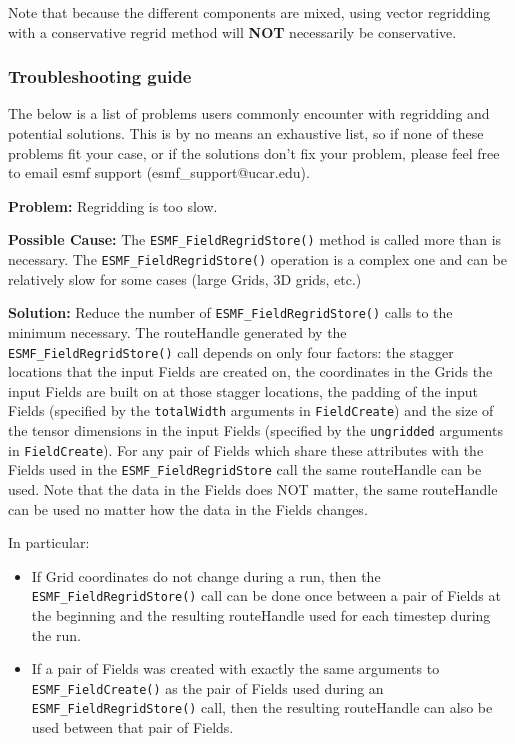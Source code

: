 Note that because the different components are mixed, using vector regridding with a conservative regrid method will {\bf NOT} necessarily be conservative. 


\subsubsection{Troubleshooting guide}

 The below is a list of problems users commonly encounter with regridding and potential solutions. 
 This is by no means an exhaustive list, so if none of these problems fit your case, or if the solutions
 don't fix your problem, please feel free to email esmf support (esmf\_support@ucar.edu).

 \bigskip
 
 {\bf Problem:} Regridding is too slow.

 \medskip

 {\bf Possible Cause:} The {\tt ESMF\_FieldRegridStore()} method is called more than is necessary. \newline
 The {\tt ESMF\_FieldRegridStore()} operation is a complex one and can be 
 relatively slow for some cases (large Grids, 3D grids, etc.) 
 
 \smallskip

 {\bf Solution:} Reduce the number of {\tt ESMF\_FieldRegridStore()} calls to the minimum necessary. The
 routeHandle generated by the {\tt ESMF\_FieldRegridStore()} call depends on only four factors: the 
 stagger locations that the input Fields are created on, the coordinates in the Grids the input Fields
 are built on at those stagger locations, the padding of the input Fields 
 (specified by the {\tt totalWidth} arguments in {\tt FieldCreate}) and the size of the tensor
 dimensions in the input Fields (specified by the {\tt ungridded} arguments in {\tt FieldCreate}). 
 For any pair of Fields which share these attributes with the Fields used in the
 {\tt ESMF\_FieldRegridStore} call  the same routeHandle can be used. Note that the data in the 
 Fields does NOT matter, the same routeHandle can be used no matter how the data in the Fields changes.

 \smallskip

 In particular:
 \begin{itemize}

 \item If Grid coordinates do not change during a run, then the {\tt ESMF\_FieldRegridStore()} call can be
 done once between a pair of Fields at the beginning and the resulting routeHandle used for each 
 timestep during the run. 

 \item If a pair of Fields was created with exactly the same arguments to {\tt ESMF\_FieldCreate()} as the 
 pair of Fields used during an {\tt ESMF\_FieldRegridStore()} call, then the resulting routeHandle can 
 also be used between that pair of Fields. 
 \end{itemize}

